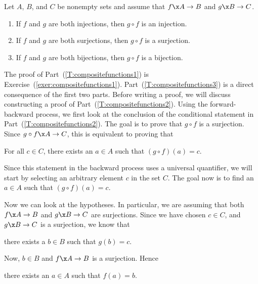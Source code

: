 \begin{theorem} \label{T:compositefunctions}
Let  $A$, $B$, and  $C$  be nonempty sets and assume that $f\x A \to B$ and 
$g\x B \to C$.

\begin{enumerate}
\item If  $f$  and  $g$  are both injections, then  $g \circ f$  is an injection. 
\label{T:compositefunctions1}

\item If  $f$  and  $g$  are both surjections, then  $g \circ f$  is a surjection. \label{T:compositefunctions2}

\item If  $f$  and  $g$  are both bijections, then  $g \circ f$  is a bijection. \label{T:compositefunctions3}
\end{enumerate}
\end{theorem}
%
The proof of Part~(\ref{T:compositefunctions1}) is Exercise~(\ref{exer:compositefunctions1}).   Part~(\ref{T:compositefunctions3}) is a direct consequence of the first two parts.  Before writing a proof, we will discuss constructing a proof  of Part~(\ref{T:compositefunctions2}).  Using the forward-backward process, we first look at the conclusion of the conditional statement in Part~(\ref{T:compositefunctions2}).  The goal is to prove that  $g \circ f$  is a surjection.  Since  $g \circ f\x A \to C$, this is equivalent to proving that

\begin{center}
For all  $c \in C$, there exists an  $a \in A$  such that  
$( {g \circ f} )( a ) = c$.
\end{center}

Since this statement in the backward process uses a universal quantifier, we will start by selecting an arbitrary element $c$ in the set $C$.  The goal now is to find an  $a \in A$  such that  $( {g \circ f} )( a ) = c$.

Now we can look at the hypotheses.  In particular, we are assuming that both  $f\x A \to B$  and  $g\x B \to C$  are surjections.  Since  we have chosen  $c \in C$,  and  $g\x B \to C$  is a surjection, we know that

\begin{center}
there exists a  $b \in B$  such that  $g( b ) = c$.
\end{center}

\noindent
Now, $b \in B$  and   $f\x A \to B$  is a surjection.  Hence

\begin{center}
there exists an  $a \in A$  such that  $f( a ) = b$.
\end{center}

